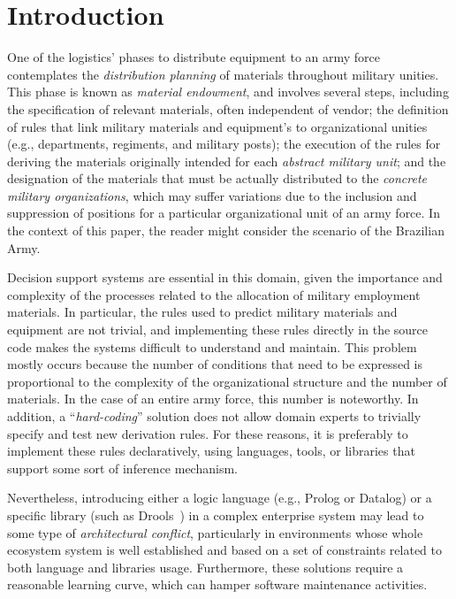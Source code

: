 \documentclass{bmcart}
\begin{document}
\section*{Introduction}\label{sec:Introduction}
One of the logistics' phases to distribute equipment to an army force contemplates the \emph{distribution planning} of materials throughout military unities. This phase is known as \emph{material endowment}, and involves several steps, including the specification of 
relevant materials, often independent of vendor; the definition of rules that link military materials and equipment's to organizational unities (e.g., departments, regiments, and military posts); the execution of the rules for deriving the materials originally intended for each \emph{abstract military unit}; and the designation of the materials that must be actually distributed to the \emph{concrete military organizations}, which may suffer variations due to the inclusion and suppression of positions for a particular organizational unit of an army force. In the context of this paper, the reader might consider the scenario of the Brazilian Army. 

Decision support systems are essential in this domain, given the importance and complexity of the processes related to the allocation of military employment materials. In particular, the rules used to predict military materials and equipment are not trivial, and implementing these rules directly in the source code makes the systems difficult to understand and maintain. This problem mostly occurs because the number of conditions that need to be expressed is proportional to the complexity of the organizational structure and the number of materials. In the case of an entire army force, this number is noteworthy. In addition, a ``\emph{hard-coding}'' solution does not allow domain experts to trivially specify and test new derivation rules. For these reasons, it is preferably to implement these rules declaratively, using languages, tools, or libraries that support some sort of inference mechanism.

Nevertheless, introducing either a logic language (e.g., Prolog or Datalog) or a specific library (such as Drools~\cite{browne2009}) in a complex enterprise system may lead to some type of \emph{architectural conflict}, particularly in environments whose whole ecosystem system is well established and based on a set of constraints related to both language and libraries usage. Furthermore, these solutions require a reasonable learning curve, which can hamper software maintenance activities.
\end{document}
